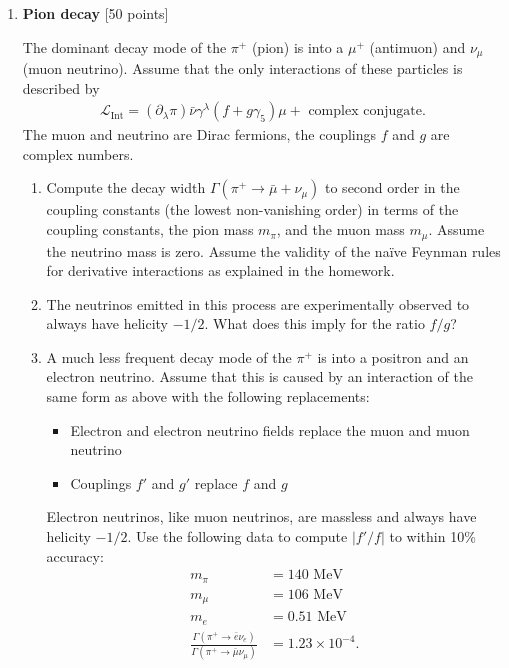 \documentclass[12pt]{article}
\begin{document}
\newpage

\begin{enumerate}
	
	
	\item {\bf Pion decay} [50 points]
	
	The dominant decay mode of the $\pi^+$ (pion) is into a $\mu^+$ (antimuon) and $\nu_\mu$ (muon neutrino). Assume that the only interactions of these particles is described by
	\begin{align*}
		\mathcal{L}_\text{Int} = (\partial_\lambda \pi) \bar\nu \gamma^\lambda (f+g\gamma_5)\mu + \text{ complex conjugate}.
	\end{align*}
	The muon and neutrino are Dirac fermions, the couplings $f$ and $g$ are complex numbers.
	
	\begin{enumerate}
		\item Compute the decay width $\Gamma(\pi^+\to \bar\mu + \nu_\mu)$ to second order in the coupling constants (the lowest non-vanishing order) in terms of the coupling constants, the pion mass $m_\pi$, and the muon mass $m_\mu$. Assume the neutrino mass is zero. Assume the validity of the na\"ive Feynman rules for derivative interactions as explained in the homework.
		\item  The neutrinos emitted in this process are experimentally observed to always have helicity $-1/2$. What does this imply for the ratio $f/g$?
		\item A much less frequent decay mode of the $\pi^+$ is into a positron and an electron neutrino. Assume that this is caused by an interaction of the same form as above with the following replacements:
		\begin{itemize}
			\item Electron and electron neutrino fields replace the muon and muon neutrino
			\item Couplings $f'$ and $g'$ replace $f$ and $g$
		\end{itemize}
		Electron neutrinos, like muon neutrinos, are massless and always have helicity $-1/2$. Use the following data to compute $|f'/f|$ to within 10\% accuracy:
			\begin{align*}
				m_\pi &= 140 \text{ MeV}\\
				m_\mu &= 106 \text{ MeV}\\
				m_e &= 0.51 \text{ MeV}\\
				\frac{\Gamma(\pi^+\to \bar e \nu_e)}{\Gamma(\pi^+\to \bar \mu \nu_\mu)}
				&= 1.23 \times 10^{-4}.
			\end{align*}
	\end{enumerate}
	


\end{enumerate}
\end{document}
